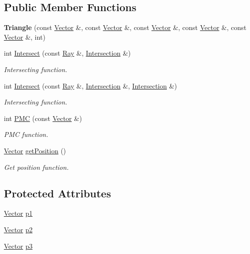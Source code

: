 \subsection*{\-Public \-Member \-Functions}
\begin{DoxyCompactItemize}
\item 
\hypertarget{class_triangle_a793ed45b623e913b5ea59799a29a2ebf}{
{\bfseries \-Triangle} (const \hyperlink{class_vector}{\-Vector} \&, const \hyperlink{class_vector}{\-Vector} \&, const \hyperlink{class_vector}{\-Vector} \&, const \hyperlink{class_vector}{\-Vector} \&, const \hyperlink{class_vector}{\-Vector} \&, int)}
\label{class_triangle_a793ed45b623e913b5ea59799a29a2ebf}

\item 
int \hyperlink{class_triangle_a24e02176baf3ba8b613bef47e4f416a9}{\-Intersect} (const \hyperlink{class_ray}{\-Ray} \&, \hyperlink{class_intersection}{\-Intersection} \&)
\begin{DoxyCompactList}\small\item\em \-Intersecting function. \end{DoxyCompactList}\item 
int \hyperlink{class_triangle_a4c4505c8ada8702526051f53f5a951cd}{\-Intersect} (const \hyperlink{class_ray}{\-Ray} \&, \hyperlink{class_intersection}{\-Intersection} \&, \hyperlink{class_intersection}{\-Intersection} \&)
\begin{DoxyCompactList}\small\item\em \-Intersecting function. \end{DoxyCompactList}\item 
int \hyperlink{class_triangle_ab6066a8828559d40c1f88dfcf92723bb}{\-P\-M\-C} (const \hyperlink{class_vector}{\-Vector} \&)
\begin{DoxyCompactList}\small\item\em \-P\-M\-C function. \end{DoxyCompactList}\item 
\hyperlink{class_vector}{\-Vector} \hyperlink{class_triangle_ad26a8346e3d5f5c65c3e982d8e1f260e}{get\-Position} ()
\begin{DoxyCompactList}\small\item\em \-Get position function. \end{DoxyCompactList}\end{DoxyCompactItemize}
\subsection*{\-Protected \-Attributes}
\begin{DoxyCompactItemize}
\item 
\hyperlink{class_vector}{\-Vector} \hyperlink{class_triangle_adebd4b41a74691d5da67db5c8f852672}{p1}
\item 
\hyperlink{class_vector}{\-Vector} \hyperlink{class_triangle_a7bba48c61a088c93914768018b2329af}{p2}
\item 
\hyperlink{class_vector}{\-Vector} \hyperlink{class_triangle_a7df8e8ed225f77daee7e5eb4bf5b9f99}{p3}
\end{DoxyCompactItemize}


